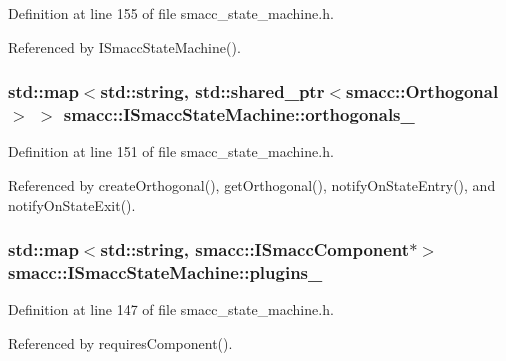 Definition at line 155 of file smacc\+\_\+state\+\_\+machine.\+h.



Referenced by I\+Smacc\+State\+Machine().

\subsubsection[{\texorpdfstring{orthogonals\+\_\+}{orthogonals_}}]{\setlength{\rightskip}{0pt plus 5cm}std\+::map$<$std\+::string, std\+::shared\+\_\+ptr$<${\bf smacc\+::\+Orthogonal}$>$ $>$ smacc\+::\+I\+Smacc\+State\+Machine\+::orthogonals\+\_\+\hspace{0.3cm}{\ttfamily [private]}}\hypertarget{classsmacc_1_1ISmaccStateMachine_ae8e5c25d0aecd91fe496df13751bc667}{}\label{classsmacc_1_1ISmaccStateMachine_ae8e5c25d0aecd91fe496df13751bc667}


Definition at line 151 of file smacc\+\_\+state\+\_\+machine.\+h.



Referenced by create\+Orthogonal(), get\+Orthogonal(), notify\+On\+State\+Entry(), and notify\+On\+State\+Exit().

\subsubsection[{\texorpdfstring{plugins\+\_\+}{plugins_}}]{\setlength{\rightskip}{0pt plus 5cm}std\+::map$<$std\+::string, {\bf smacc\+::\+I\+Smacc\+Component}$\ast$$>$ smacc\+::\+I\+Smacc\+State\+Machine\+::plugins\+\_\+\hspace{0.3cm}{\ttfamily [private]}}\hypertarget{classsmacc_1_1ISmaccStateMachine_aaf2f1f4dec865e5b6a92a6fb231f204f}{}\label{classsmacc_1_1ISmaccStateMachine_aaf2f1f4dec865e5b6a92a6fb231f204f}


Definition at line 147 of file smacc\+\_\+state\+\_\+machine.\+h.



Referenced by requires\+Component().


